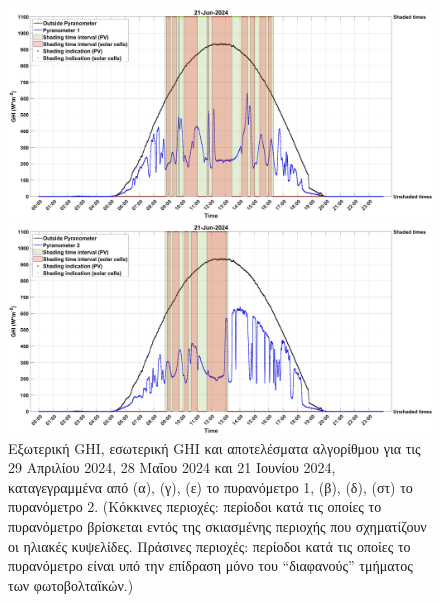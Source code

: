 \documentclass[12pt, a4paper]{report} %
\newcommand{\english}{\foreignlanguage{english}}
\begin{document}
\begin{figure}[H]
\begin{adjustwidth}{-0.7cm}{0cm}
        \begin{minipage}[c]{0.5\textwidth}
            \centering
            \includegraphics[scale=0.085]{21_Jun_GHI_1.jpg}
            \caption*{\hspace{35pt}(ε)}{}
        \end{minipage}
        \hfill
        \begin{minipage}[c]{0.5\textwidth}
            \centering
            \includegraphics[scale=0.085]{21_Jun_GHI_2.jpg}
            \caption*{\hspace{35pt}(στ)}{}
        \end{minipage}
    \end{adjustwidth}
    \caption{Εξωτερική \english{GHI}, εσωτερική \english{GHI} και αποτελέσματα αλγορίθμου για τις 29 Απριλίου 2024, 28 Μαΐου 2024 
    και 21 Ιουνίου 2024, καταγεγραμμένα από (α), (γ), (ε) το πυρανόμετρο 1, (β), (δ), (στ) το πυρανόμετρο 2. (Κόκκινες περιοχές: 
    περίοδοι κατά τις οποίες το πυρανόμετρο βρίσκεται εντός της σκιασμένης περιοχής που σχηματίζουν οι ηλιακές κυψελίδες. 
    Πράσινες περιοχές: περίοδοι κατά τις οποίες το πυρανόμετρο είναι υπό την επίδραση μόνο του “διαφανούς” τμήματος των 
    φωτοβολταϊκών.)}
    \label{fig_GHI_data}
\end{figure}
\end{document}
